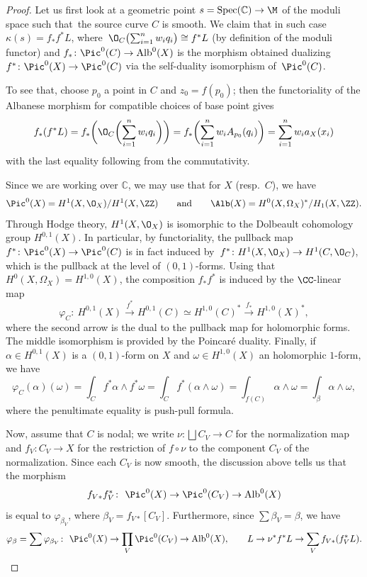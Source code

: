 \begin{proof}
Let us first look at a geometric point $s=\operatorname{Spec}(\mathbb C)\to\M$ of the moduli space such that~the source curve $C$ is smooth. We claim that in such case
$\kappa(s)=f_*f^*L$,
where~${\O_C \bigl(\sum_{i=1}^n w_i q_i\bigr)\cong f^*L}$ (by definition of the moduli functor) and
$f_*\colon\Pic^0(C)\to\operatorname{Alb}^0(X)$ is the morphism obtained dualizing $f^*\colon\Pic^0(X)\to\Pic^0(C)$ via the self-duality isomorphism of~$\Pic^0(C)$.

To see that, choose $p_0$ a point in $C$ and $z_0=f(p_0)$; then the functoriality of the Albanese morphism for compatible choices of base point gives
\[f_*(f^*L)=f_*\biggl(\O_C\biggl(\sum_{i=1}^n w_i q_i\biggr)\biggr)=f_*\biggl(\sum_{i=1}^n w_i A_{p_0}(q_i)\biggr)= \sum_{i=1}^n w_i a_X(x_i)\]
with the last equality following from the commutativity.

Since we are working over $\mathbb C$, we may use that for $X$ (resp.\ $C$), we have
 \[ \Pic^0(X)=H^1(X,\O_X)/H^1(X,\ZZ) \qquad \text{and}\qquad \Alb(X)=H^0(X,\Omega_X)^*/H_1(X,\ZZ). \]
Through Hodge theory, $H^1(X,\O_X)$ is isomorphic to the Dolbeault cohomology group $H^{0,1}(X)$. In particular, by functoriality, the pullback map $f^*\colon\Pic^0(X)\to\Pic^0(C)$ is in fact induced by~${f^*\colon H^1(X,\O_X)\to H^1(C,\O_C)}$, which is the pullback at the level of $(0,1)$-forms. Using that $H^0(X,\Omega_X)=H^{1,0}(X)$, the composition $f_* f^*$ is induced by the $\CC$-linear map
 \[ \varphi_C \colon\ H^{0,1}(X) \xrightarrow{f^*} H^{0,1}(C)\simeq H^{1,0}(C)^*\xrightarrow{f_*}H^{1,0}(X)^*, \]
where the second arrow is the dual to the pullback map for holomorphic forms. The middle isomorphism is provided by the Poincar\'e duality. Finally, if $\alpha\in H^{0,1}(X)$ is a $(0,1)$-form on $X$ and $\omega\in H^{1,0}(X)$ an holomorphic $1$-form, we have
 \[ \varphi_C(\alpha)(\omega) = \int_C f^*\alpha\wedge f^*\omega = \int_C f^*(\alpha\wedge\omega) = \int_{f(C)}\alpha\wedge\omega= \int_\beta \alpha\wedge\omega, \]
where the penultimate equality is push-pull formula.

Now, assume that $C$ is nodal; we write $\nu\colon\bigsqcup C_V\to C$ for the normalization map and $f_V\colon C_V\to X$ for the restriction of $f\circ\nu$ to the component $C_V$ of the normalization. Since each $C_V$ is now smooth, the discussion above tells us that the morphism
\[
f_{V\ast}f_V^*\colon\ \Pic^0(X)\to\Pic^0(C_V)\to\operatorname{Alb}^0(X)
\]
is equal to $\varphi_{\beta_V}$, where $\beta_V=f_{V\ast}[C_V]$. Furthermore, since $\sum \beta_V=\beta$, we have
\begin{align*}
\varphi_{\beta}=\sum \varphi_{\beta_V}\colon\ \Pic^0(X) \to\prod_V\Pic^0(C_V)\to\operatorname{Alb}^0(X),\qquad
 L \to \nu^*f^*L\to \sum_V f_{V\ast}(f_V^*L).
\end{align*}


\end{proof}

